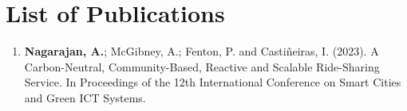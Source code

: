 

\begin{minipage}[t]{\textwidth}

\chapter*{\centering \Large List of Publications}

\begin{enumerate}

    \item \textbf{Nagarajan, A.}; McGibney, A.; Fenton, P. and Castiñeiras, I. (2023). A Carbon-Neutral, Community-Based, Reactive and Scalable Ride-Sharing Service.  In Proceedings of the 12th International Conference on Smart Cities and Green ICT Systems.

\end{enumerate}

\end{minipage}